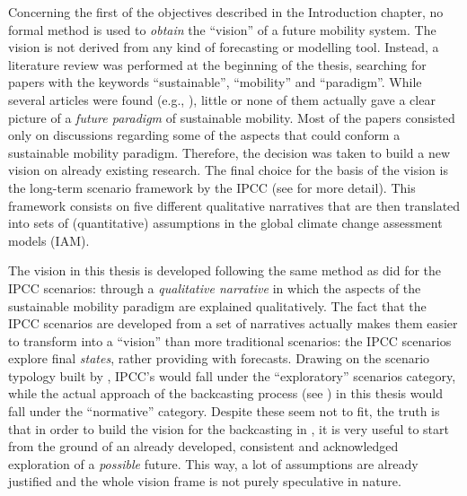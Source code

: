Concerning the first of the objectives described in the Introduction chapter, no formal method is used to \emph{obtain} the ``vision'' of a future mobility system. The vision is not derived from any kind of forecasting or modelling tool. Instead, a literature review was performed at the beginning of the thesis, searching for papers with the keywords ``sustainable'', ``mobility'' and ``paradigm''. While several articles were found (e.g., \textcite{banister2008_sustainablemobilityparadigm}), little or none of them actually gave a clear picture of a \emph{future paradigm} of sustainable mobility. Most of the papers consisted only on discussions regarding some of the aspects that could conform a sustainable mobility paradigm. Therefore, the decision was taken to build a new vision on already existing research. The final choice for the basis of the vision is the long-term scenario framework by the \gls{IPCC} (see  for more detail). This framework consists on five different qualitative narratives that are then translated into sets of (quantitative) assumptions in the global climate change assessment models (\gls{IAM}).

The vision in this thesis is developed following the same method as \textcite{oneill2017_roadsaheadNarratives} did for the IPCC scenarios: through a \emph{qualitative narrative} in which the aspects of the sustainable mobility paradigm are explained qualitatively. The fact that the IPCC scenarios are developed from a set of narratives actually makes them easier to transform into a ``vision'' than more traditional scenarios: the IPCC scenarios explore final \emph{states}, rather providing with forecasts. Drawing on the scenario typology built by \textcite{boerjeson2006_Scenariotypestechniques}, IPCC's would fall under the ``exploratory'' scenarios category, while the actual approach of the backcasting process (see ) in this thesis would fall under the ``normative'' category. Despite these seem not to fit, the truth is that in order to build the vision for the backcasting in , it is very useful to start from the ground of an already developed, consistent and acknowledged exploration of a \emph{possible} future. This way, a lot of assumptions are already justified and the whole vision frame is not purely speculative in nature.